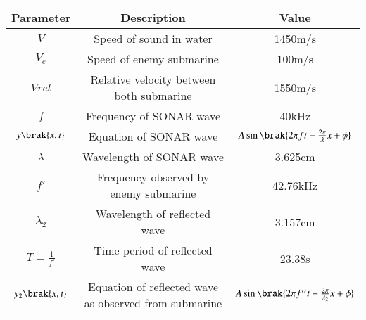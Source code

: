 \begin{tabular}{|c|c|c|}
   
   \hline
   Parameter & Description & Value\\
   \hline
   $V $& Speed of sound in water & 1450m/s\\
   \hline 
   $V_e$ & Speed of enemy submarine & 100m/s\\
   \hline 
   $Vrel$ & Relative velocity between both submarine & 1550m/s\\
   \hline
   $f $& Frequency of SONAR wave & 40kHz\\ 
   \hline
   $y\brak{x,t}$ & Equation of SONAR wave & $A\sin\brak{2\pi ft-\frac{2\pi}{\lambda}x+\phi}$\\
   \hline
   $\lambda$ & Wavelength of SONAR wave & 3.625cm\\
    \hline
   $ f' $& Frequency observed by enemy submarine & 42.76kHz\\
   \hline
   $\lambda_2$ & Wavelength of reflected wave & 3.157cm\\
   \hline 
   $T=\frac{1}{f'}$ & Time period of reflected wave & 23.38s\\
   \hline
  $ y_2\brak{x,t}$ & Equation of reflected wave as observed from submarine& $A\sin\brak{2\pi f''t-\frac{2\pi}{\lambda_2}x+\phi}$\\
   \hline
   
\end{tabular}   
